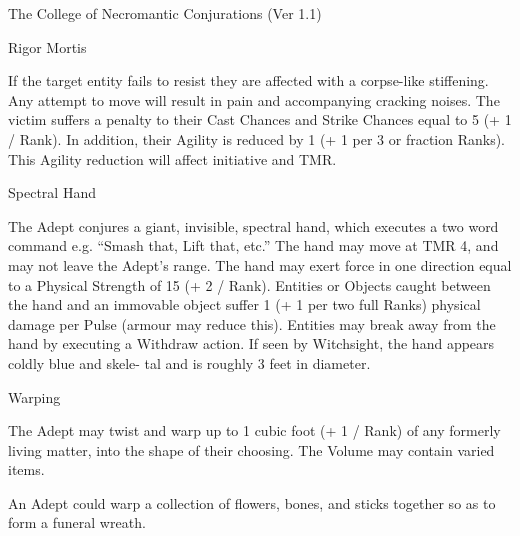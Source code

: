 \begin{Chapter}{The College of Necromantic Conjurations (Ver 1.1)}
\begin{spell}[G-9]{Rigor Mortis}
\begin{effects}
If the target entity fails to resist they are affected with a
corpse-like stiffening. Any attempt to move will result in pain and
accompanying cracking noises.  The victim suffers a penalty to their
Cast Chances and Strike Chances equal to 5 (+ 1 / Rank).  In addition,
their Agility is reduced by 1 (+ 1 per 3 or fraction Ranks).  This
Agility reduction will affect initiative and TMR.
\end{effects}
\end{spell}

\begin{spell}[G-10]{Spectral Hand}

\begin{effects}
The Adept conjures a giant, invisible, spectral hand, which executes a
two word command e.g.  “Smash that, Lift that, etc.”  The hand may
move at TMR 4, and may not leave the Adept’s range.  The hand may
exert force in one direction equal to a Physical Strength of 15 (+ 2 /
Rank). Entities or Objects caught between the hand and an immovable
object suffer 1 (+ 1 per two full Ranks) physical damage per Pulse
(armour may reduce this).  Entities may break away from the hand by
executing a Withdraw action.  If seen by Witchsight, the hand appears
coldly blue and skele- tal and is roughly 3 feet in diameter.

\end{effects}
\end{spell}

\begin{spell}[G-11]{Warping}

\begin{effects}
The Adept may twist and warp up to 1 cubic foot (+ 1 / Rank) of any
formerly living matter, into the shape of their choosing.  The Volume
may contain varied items.

\begin{example} 
An Adept could warp a collection of flowers, bones, and sticks
together so as to form a funeral wreath.
\end{example}


\end{effects}
\end{spell}
\end{Chapter}
